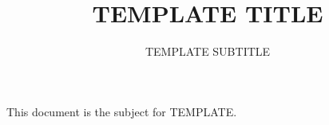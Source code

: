 \documentclass{42-fr}
\begin{document}
\title{TEMPLATE TITLE}
\subtitle{TEMPLATE SUBTITLE}

\summary
{
This document is the subject for TEMPLATE.
}

\maketitle

\tableofcontents
\end{document}
